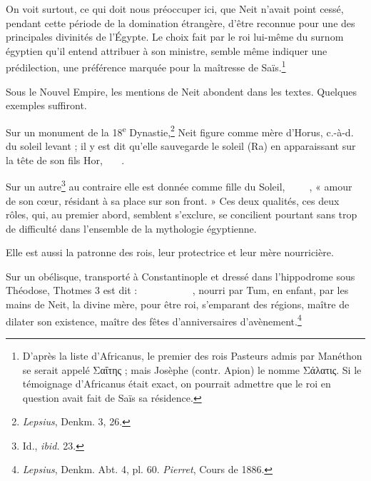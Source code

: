 \documentclass[a4paper, 11pt, oneside]{article}
\newcommand*\hieroAAAI{}
\newcommand*\hieroAAAX{}
\newcommand*\hieroAAAY{}
\newcommand*\hieroAABC{\raisebox{0.5ex}{}}
\newcommand*\hieroAABR{}
\newcommand*\hieroAACB{\raisebox{0.5ex}{}}
\newcommand*\hieroAACM{}
\newcommand*\hieroAACS{}
\newcommand*\hieroAAEC{}
\newcommand*\hieroAAEK{}
\newcommand*\hieroAAEP{\raisebox{0.5ex}{}}
\newcommand*\hieroAAEZ{}
\newcommand*\hieroAAFA{}
\newcommand*\hieroAAHY{}
\newcommand*\hieroAAIF{}
\newcommand*\hieroAAKO{}
\newcommand*\hieroAALR{\raisebox{0.3ex}{}}
\newcommand*\hieroAAND{\raisebox{0.5ex}{}}
\newcommand*\hieroAANP{}
\newcommand*\hieroAAON{}
\newcommand*\hieroAATW{}
\newcommand*\hieroAAVF{}
\newcommand*\hieroAAVR{}
\newcommand*\hieroAAVS{}
\newcommand*\hieroAAVT{\raisebox{0.3ex}{}}
\newcommand*\hieroAAVU{}
\newcommand*\hieroAAVV{}
\newcommand*\hieroAAVW{}
\newcommand*\hieroAAVY{}
\newcommand*\hieroAAVZ{}
\newcommand*\hieroAAWA{}
\newcommand*\hieroAAWB{\raisebox{0.3ex}{}}
\newcommand*\hieroAAWC{}
\newcommand*\hieroAAWD{}
\newcommand*\hieroAAWE{}
\newcommand*\hieroAAWF{}
\newcommand*\hieroAAWG{}
\newcommand*\hieroAAWH{}
\begin{document}
On voit surtout, ce qui doit nous préoccuper ici, que Neit n'avait point cessé, pendant cette période de la domination étrangère, d'être reconnue pour une des principales divinités de l'Égypte. Le choix fait par le roi lui-même du surnom égyptien qu'il entend attribuer à son ministre, semble même indiquer une prédilection, une préférence marquée pour la maîtresse de Saïs.\footnote{D'après la liste d'Africanus, le premier des rois Pasteurs admis par Manéthon se serait appelé Σαΐτης ; mais Josèphe (contr. Apion) le nomme Σάλατις. Si le témoignage d'Africanus était exact, on pourrait admettre que le roi en question avait fait de Saïs sa résidence.}

Sous le Nouvel Empire, les mentions de Neit abondent dans les textes. Quelques exemples suffiront.

Sur un monument de la 18\textsuperscript{e} Dynastie,\footnote{\emph{Lepsius}, Denkm. 3, 26.} Neit figure comme mère d'Horus, c.-à-d. du soleil levant ; il y est dit qu'elle sauvegarde le soleil (Ra) en apparaissant sur la tête de son fils Hor, $\hieroAACS\:\hieroAAVR\:\hieroAAIF\allowbreak\:\hieroAATW\:\hieroAAEC\:\hieroAAVF\allowbreak\:\hieroAAVS\:\hieroAAON$.

Sur un autre\footnote{Id., \emph{ibid.} 23.} au contraire elle est donnée comme fille du Soleil, $\hieroAAAI\:\hieroAACB\:\hieroAAND\allowbreak\:\hieroAAVT\:\hieroAAVU\:\hieroAAVV\allowbreak\:\hieroAAHY\:\hieroAACS\allowbreak\:\hieroAANP\:\hieroAAVW$, « amour de son cœur, résidant à sa place sur son front. » Ces deux qualités, ces deux rôles, qui, au premier abord, semblent s'exclure, se concilient pourtant sans trop de difficulté dans l'ensemble de la mythologie égyptienne.

Elle est aussi la patronne des rois, leur protectrice et leur mère nourricière.

Sur un obélisque, transporté à Constantinople et dressé dans l'hippodrome sous Théodose, Thotmes 3 est dit : $\hieroAAVY\:\hieroAAVZ\:\hieroAABR\allowbreak\:\hieroAAAY\:\hieroAAEZ\:\hieroAAFA\:\hieroAAEC\:\hieroAAWA\:\hieroAALR\allowbreak\:\hieroAAEK\:\hieroAAKO\:\hieroAACB\:\hieroAAEP\:\hieroAAAX\:\hieroAACB\allowbreak\:\hieroAAWB\:\hieroAAWC\:\hieroAABC\:\hieroAAWD\:\hieroAAWE\:\hieroAACM\allowbreak\:\hieroAAWF\:\hieroAAWG\:\hieroAAWH$, nourri par
Tum, en enfant, par les mains de Neit, la divine mère, pour être roi, s'emparant des régions, maître de dilater son existence, maître des fêtes d'anniversaires d'avènement.\footnote{\emph{Lepsius}, Denkm. Abt. 4, pl. 60. \emph{Pierret}, Cours de 1886.}
\end{document}
